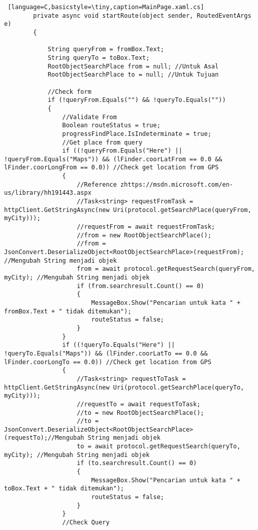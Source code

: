 \begin{lstlisting} [language=C,basicstyle=\tiny,caption=MainPage.xaml.cs]
        private async void startRoute(object sender, RoutedEventArgs e)
        {
            
            String queryFrom = fromBox.Text;
            String queryTo = toBox.Text;
            RootObjectSearchPlace from = null; //Untuk Asal
            RootObjectSearchPlace to = null; //Untuk Tujuan

            //Check form
            if (!queryFrom.Equals("") && !queryTo.Equals(""))
            {
                //Validate From
                Boolean routeStatus = true;
                progressFindPlace.IsIndeterminate = true;
                //Get place from query
                if ((!queryFrom.Equals("Here") || !queryFrom.Equals("Maps")) && (lFinder.coorLatFrom == 0.0 && lFinder.coorLongFrom == 0.0)) //Check get location from GPS
                {
                    //Reference zhttps://msdn.microsoft.com/en-us/library/hh191443.aspx
                    //Task<string> requestFromTask = httpClient.GetStringAsync(new Uri(protocol.getSearchPlace(queryFrom, myCity)));
                    //requestFrom = await requestFromTask;
                    //from = new RootObjectSearchPlace();
                    //from = JsonConvert.DeserializeObject<RootObjectSearchPlace>(requestFrom); //Mengubah String menjadi objek
                    from = await protocol.getRequestSearch(queryFrom, myCity); //Mengubah String menjadi objek
                    if (from.searchresult.Count() == 0)
                    {
                        MessageBox.Show("Pencarian untuk kata " + fromBox.Text + " tidak ditemukan");
                        routeStatus = false;
                    }
                }
                if ((!queryTo.Equals("Here") || !queryTo.Equals("Maps")) && (lFinder.coorLatTo == 0.0 && lFinder.coorLongTo == 0.0)) //Check get location from GPS
                {
                    //Task<string> requestToTask = httpClient.GetStringAsync(new Uri(protocol.getSearchPlace(queryTo, myCity)));
                    //requestTo = await requestToTask;
                    //to = new RootObjectSearchPlace();
                    //to = JsonConvert.DeserializeObject<RootObjectSearchPlace>(requestTo);//Mengubah String menjadi objek
                    to = await protocol.getRequestSearch(queryTo, myCity); //Mengubah String menjadi objek
                    if (to.searchresult.Count() == 0)
                    {
                        MessageBox.Show("Pencarian untuk kata " + toBox.Text + " tidak ditemukan");
                        routeStatus = false;
                    }
                }
                //Check Query

\end{lstlisting}

